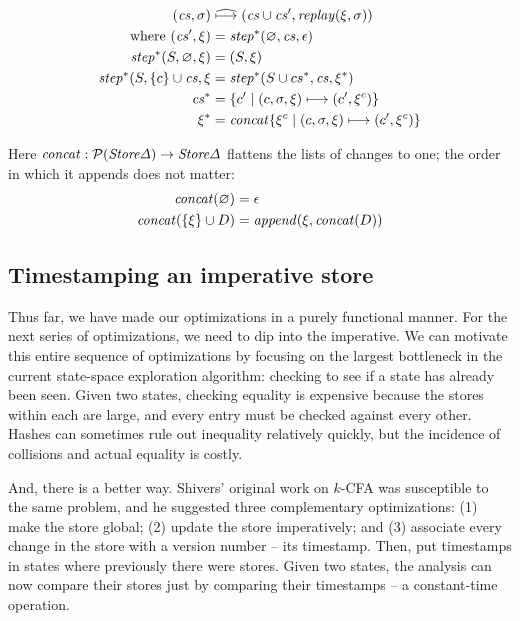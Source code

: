 \documentclass[preprint,onecolumn,9pt]{sigplanconf} %
\begin{document}
\begin{align*}
(\mathit{cs}, \sigma) &\mathrel{\widehat{\longmapsto}} (\mathit{cs}\cup \mathit{cs}', \mathit{replay}(\xi,\sigma)) \\
\mbox{ where } (\mathit{cs}', \xi) &= \mathit{step}^*(\varnothing, \mathit{cs}, \epsilon) \\
\mathit{step}^*(S, \varnothing, \xi) &= (S, \xi) \\
\mathit{step}^*(S, \{c\}\cup \mathit{cs}, \xi &= \mathit{step}^*(S\cup cs^*, \mathit{cs}, \xi^*) \\
\mathit{cs}^* &= \{c' \mid (c,\sigma,\xi) \longmapsto (c',\xi^c) \} \\
\xi^* &= \mathit{concat}\{\xi^c \mid (c, \sigma,\xi) \longmapsto (c', \xi^c)\}
\end{align*}

Here $\mathit{concat} : \mathcal{P}(\mathit{Store\Delta}) \to \mathit{Store\Delta}$ flattens the lists
of changes to one; the order in which it appends does not matter:
\begin{align*}
\mathit{concat}(\varnothing) &= \epsilon \\
\mathit{concat}(\{\xi\}\cup D) &= \mathit{append}(\xi, \mathit{concat}(D))
\end{align*}


\subsection{Timestamping an imperative store}

Thus far, we have made our optimizations in a purely functional
manner. For the next series of optimizations, we need to dip into the
imperative. We can motivate this entire sequence of optimizations by
focusing on the largest bottleneck in the current state-space
exploration algorithm: checking to see if a state has already been
seen. Given two states, checking equality is expensive because the
stores within each are large, and every entry must be checked against
every other. Hashes can sometimes rule out inequality relatively
quickly, but the incidence of collisions and actual equality is
costly.

And, there is a better way. Shivers' original work on $k$-CFA was
susceptible to the same problem, and he suggested three complementary
optimizations: (1) make the store global; (2) update the store
imperatively; and (3) associate every change in the store with a
version number -- its timestamp. Then, put timestamps in states
where previously there were stores. Given two states, the analysis can
now compare their stores just by comparing their timestamps -- a
constant-time operation.
\end{document}
